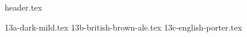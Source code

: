 \clearpage
{}
\divisorLine
{header.tex}
\begin{multicols}{2}
{13a-dark-mild.tex}
{13b-british-brown-ale.tex}
{13c-english-porter.tex}
\end{multicols}